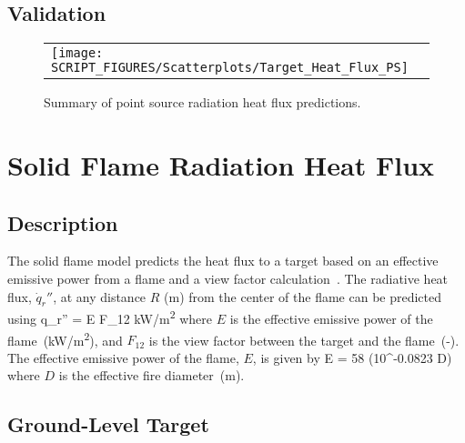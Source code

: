 \subsection*{Validation}

\begin{figure}[!ht]
\begin{center}
\begin{tabular}{l}
\texttt{[image: SCRIPT\_FIGURES/Scatterplots/Target\_Heat\_Flux\_PS]}
\end{tabular}
\end{center}
\caption[Summary of point source radiation heat flux predictions]
{Summary of point source radiation heat flux predictions.}
\label{Heat_Flux_Point_Source_Summary}
\end{figure}


\clearpage


\section{Solid Flame Radiation Heat Flux}

\subsection*{Description}

The solid flame model predicts the heat flux to a target based on an effective emissive power from a flame and a view factor calculation~\cite{Beyler2:SFPE}.
The radiative heat flux, $\dot q_r''$, at any distance $R$ (\si{m}) from the center of the flame can be predicted using
\be
\dot q_r'' = E F_{12} \quad \si{kW/m^2}
\label{eq:solid_flame}
\ee
where $E$ is the effective emissive power of the flame~(\si{kW/m^2}), and $F_{12}$ is the view factor between the target and the flame~(-).
The effective emissive power of the flame, $E$, is given by
\be
E = 58 (10^{-0.0823 D})
\label{eq:solid_flame_E}
\ee
where $D$ is the effective fire diameter~(\si{m}).

\subsection*{Ground-Level Target}

